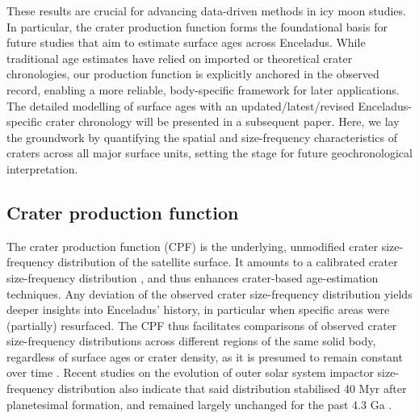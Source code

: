 \documentclass[preprint,12pt,3p,times,authoryear]{elsarticle}
\begin{document}
These results are crucial for advancing data-driven methods in icy moon studies. In particular, the crater production function forms the foundational basis for future studies that aim to estimate surface ages across Enceladus. While traditional age estimates have relied on imported or theoretical crater chronologies, our production function is explicitly anchored in the observed record, enabling a more reliable, body-specific framework for later applications. \\

The detailed modelling of surface ages with an updated/latest/revised Enceladus-specific crater chronology will be presented in a subsequent paper. Here, we lay the groundwork by quantifying the spatial and size-frequency characteristics of craters across all major surface units, setting the stage for future geochronological interpretation.

\subsection{Crater production function}
\label{sub:intro_cpf}
The crater production function (CPF) is the underlying, unmodified crater size-frequency distribution of the satellite surface. It amounts to a calibrated crater size-frequency distribution \citep{Neukum1975}, and thus enhances crater-based age-estimation techniques. 
Any deviation of the observed crater size-frequency distribution yields deeper insights into Enceladus’ history, in particular when specific areas were (partially) resurfaced. The CPF thus facilitates comparisons of observed crater size-frequency distributions across different regions of the same solid body, regardless of surface ages or crater density, as it is presumed to remain constant over time \citep{Neukum1975,Neukum1983,Werner2014,Werner2023}.
Recent studies on the evolution of outer solar system impactor size-frequency distribution also indicate that said distribution stabilised 40 Myr after planetesimal formation, and remained largely unchanged for the past 4.3 Ga \citep{Bottke2024}.\\
\end{document}
